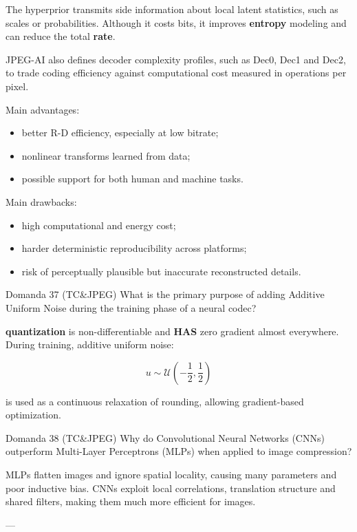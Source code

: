 The hyperprior transmits side information about local latent statistics, such as scales or probabilities. Although it costs bits, it improves \textbf{entropy} modeling and can reduce the total \textbf{rate}.

JPEG-AI also defines decoder complexity profiles, such as Dec0, Dec1 and Dec2, to trade coding efficiency against computational cost measured in operations per pixel.

Main advantages:

\begin{itemize}
  \item better R-D efficiency, especially at low bitrate;
  \item nonlinear transforms learned from data;
  \item possible support for both human and machine tasks.
\end{itemize}

Main drawbacks:

\begin{itemize}
  \item high computational and energy cost;
  \item harder deterministic reproducibility across platforms;
  \item risk of perceptually plausible but inaccurate reconstructed details.
\end{itemize}



\begin{questionbox}{Domanda 37}
(TC\&JPEG) What is the primary purpose of adding Additive Uniform Noise during the training phase of a neural codec?
\end{questionbox}


\textbf{quantization} is non-differentiable and \textbf{HAS} zero gradient almost everywhere. During training, additive uniform noise:


$$
u \sim \mathcal{U}\left(-\frac{1}{2},\frac{1}{2}\right)
$$


is used as a continuous relaxation of rounding, allowing gradient-based optimization.



\begin{questionbox}{Domanda 38}
(TC\&JPEG) Why do Convolutional Neural Networks (CNNs) outperform Multi-Layer Perceptrons (MLPs) when applied to image compression?
\end{questionbox}


MLPs flatten images and ignore spatial locality, causing many parameters and poor inductive bias. CNNs exploit local correlations, translation structure and shared filters, making them much more efficient for images.

---


